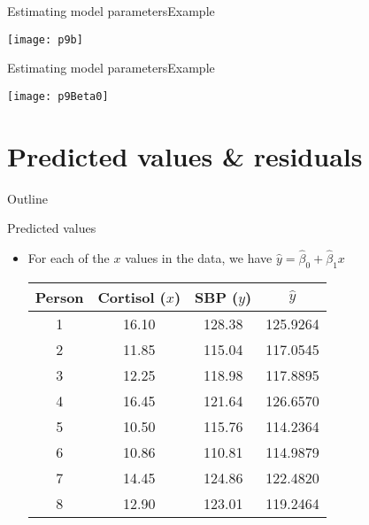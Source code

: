 \documentclass[xcolor=dvipsnames]{beamer}
\begin{document}
\begin{frame}{Estimating model parameters}{Example}
	\begin{center}
		\texttt{[image: p9b]}
	\end{center}
\end{frame}

\begin{frame}{Estimating model parameters}{Example}
\begin{center}
	\texttt{[image: p9Beta0]}
\end{center}
\end{frame}

\section{Predicted values \& residuals}
\begin{frame}{Outline}
\tableofcontents[currentsection,subsectionstyle=show/shaded/hide]
\end{frame}

\begin{frame}{Predicted values}
	\begin{itemize}
		\item For each of the $x$ values in the data, we have $\hat{y} = \hat{\beta}_0 + \hat{\beta}_1 x$
		\vspace{1mm}
		\begin{center}
			\begin{tabular}{cccc}
				\hline
				Person& Cortisol ($x$) & SBP ($y$)  & $\hat{y}$ \\ 
				\hline
				1 & 16.10 & 128.38  & 125.9264\\ 
				2 & 11.85 & 115.04  & 117.0545\\ 
				3 & 12.25 & 118.98  & 117.8895\\ 
				4 & 16.45 & 121.64  & 126.6570\\ 
				5 & 10.50 & 115.76  & 114.2364\\ 
				6 & 10.86 & 110.81  & 114.9879\\ 
				7 & 14.45 & 124.86  & 122.4820\\ 
				8 & 12.90 & 123.01  & 119.2464 \\ 
				\hline
			\end{tabular}
		\end{center}
	\end{itemize}
\end{frame}
      
\end{document}
